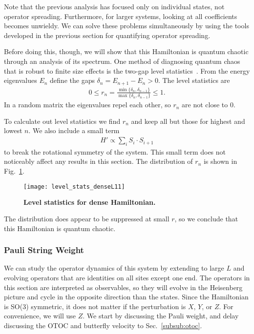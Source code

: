 Note that the previous analysis has focused only on individual states, not operator spreading. Furthermore, for larger systems, looking at all coefficients becomes unwieldy. We can solve these problems simultaneously by using the tools developed in the previous section for quantifying operator spreading.

Before doing this, though, we will show that this Hamiltonian is quantum chaotic through an analysis of its spectrum. One method of diagnosing quantum chaos that is robust to finite size effects is the two-gap level statistics~\cite{Oganesyan2007}. From the energy eigenvalues $E_n$ define the gaps $\delta_n= E_{n+1}-E_n>0$. The level statistics are
\begin{align}
0\le r_n=\frac{\min\{\delta_n,\delta_{n-1}\}}{\max\{\delta_n,\delta_{n-1}\}}
	\le1.\label{eqn:levelstats}
\end{align}
In a random matrix the eigenvalues repel each other, so $r_n$ are not close to 0.

To calculate out level statistics we find $r_n$ and keep all but those for highest and lowest $n$. We also include a small term  
\begin{align}
H'\propto\sum_i S_i\cdot S_{i+1}
\end{align}
to break the rotational symmetry of the system. This small term does not noticeably affect any results in this section. The distribution of $r_n$ is shown in Fig.~\ref{fig:level_stats_denseL11}.
\begin{figure}
	\centering
	\texttt{[image: level\_stats\_denseL11]}
	\caption{\textbf{Level statistics for dense Hamiltonian.}}
	\label{fig:level_stats_denseL11}
\end{figure}
The distribution does appear to be suppressed at small $r$, so we conclude that this Hamiltonian is quantum chaotic.

\subsubsection{Pauli String Weight} \label{subsub:pauli}  

We can study the operator dynamics of this system by extending to large $L$ and evolving operators that are identities on all sites except one end. The operators in this section are interpreted as observables, so they will evolve in the Heisenberg picture and cycle in the opposite direction than the states. Since the Hamiltonian is SO(3) symmetric, it does not matter if the perturbation is $X$, $Y$, or $Z$. For convenience, we will use $Z$. We start by discussing the Pauli weight, and delay discussing the OTOC and butterfly velocity to Sec.~\ref{subsub:otoc}.

